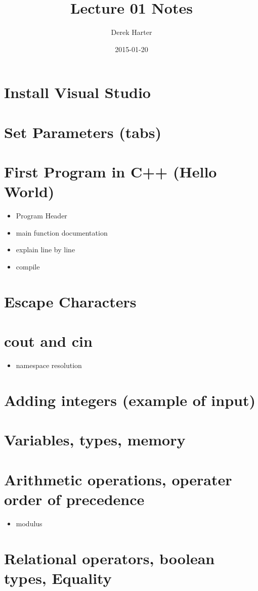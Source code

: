 \documentclass[11pt]{article}
\title{Lecture 01 Notes}
\author{Derek Harter}
\date{2015-01-20}
\begin{document}
\maketitle


\section*{Install Visual Studio}
\label{sec-1}
\section*{Set Parameters (tabs)}
\label{sec-2}
\section*{First Program in C++ (Hello World)}
\label{sec-3}

\begin{itemize}
\item Program Header
\item main function documentation
\item explain line by line
\item compile
\end{itemize}
\section*{Escape Characters}
\label{sec-4}
\section*{cout and cin}
\label{sec-5}

\begin{itemize}
\item namespace resolution
\end{itemize}
\section*{Adding integers (example of input)}
\label{sec-6}
\section*{Variables, types, memory}
\label{sec-7}
\section*{Arithmetic operations, operater order of precedence}
\label{sec-8}

\begin{itemize}
\item modulus
\end{itemize}
\section*{Relational operators, boolean types, Equality}
\label{sec-9}
\end{document}
